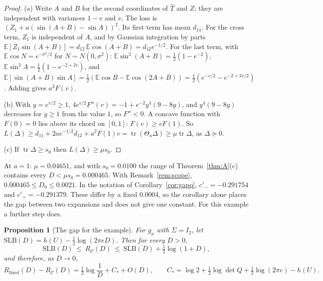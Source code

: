 \documentclass[11pt,onecolumn]{IEEEtran}
\newtheorem{proposition}[theorem]{Proposition}
\newcommand{\E}{\mathbb{E}}
\newcommand{\tr}{\operatorname{tr}}
\newcommand{\Rfix}{R_{\mathrm{fixed}}}
\newcommand{\RC}{R_{\mathcal C}}
\begin{document}
\begin{proof}
(a) Write $A$ and $B$ for the second coordinates of $\hat T$ and $Z$; they are independent
with variances $1-v$ and $v$. The loss is $(Z_1+a(\sin(A+B)-\sin A))^2$. Its first term
has mean $d_{11}$. For the cross term, $Z_1$ is independent of $A$, and by Gaussian
integration by parts $\E[Z_1\sin(A+B)]=d_{12}\,\E\cos(A+B)=d_{12}e^{-1/2}$. For the last
term, with $\E\cos N=e^{-\sigma^2/2}$ for $N\sim N(0,\sigma^2)$:
$\E\sin^2(A+B)=\tfrac12(1-e^{-2})$, $\E\sin^2A=\tfrac12(1-e^{-2+2v})$, and
$\E[\sin(A+B)\sin A]=\tfrac12(\E\cos B-\E\cos(2A+B))=\tfrac12(e^{-v/2}-e^{-2+3v/2})$.
Adding gives $a^2F(v)$.

(b) With $y=e^{v/2}\ge1$, $4e^{v/2}F''(v)=-1+e^{-2}y^4(9-8y)$, and $y^4(9-8y)$ decreases
for $y\ge1$ from the value $1$, so $F''<0$. A concave function with $F(0)=0$ lies above its
chord on $[0,1]$: $F(v)\ge vF(1)$. So $L(\Delta)\ge d_{11}+2ae^{-1/2}d_{12}+a^2F(1)v
=\tr(\Theta_a\Delta)\ge\mu\tr\Delta$, as $\Delta\succeq0$.

(c) If $\tr\Delta\ge s_0$ then $L(\Delta)\ge\mu s_0$.
\end{proof}

At $a=1$: $\mu=0.04651$, and with $s_0=0.0100$ the range of Theorem~\ref{thm:A}(c)
contains every $D<\mu s_0=0.000465$. With Remark~\ref{rem:scope},
$0.000465\le D_0\le0.0021$. In the notation of Corollary~\ref{cor:gapq},
$c'_-=-0.291754$ and $c'_+=-0.291379$. These differ by a fixed $0.0004$, so the corollary
alone places the gap between two expansions and does not give one constant. For this
example a further step does.

\begin{proposition}[The gap for the example]\label{prop:gapex}
For $g_a$ with $\Sigma=I_2$, let
$\mathrm{SLB}(D)=h(U)-\tfrac12\log(2\pi eD)$. Then for every $D>0$,
\[
\mathrm{SLB}(D)\ \le\ \RC(D)\ \le\ \mathrm{SLB}(D)+\tfrac12\log(1+D),
\]
and therefore, as $D\to0$,
\[
\Rfix(D)-\RC(D)=\tfrac12\log\frac1D+C_*+O(D),\qquad
C_*=\log2+\tfrac12\log\det Q+\tfrac12\log(2\pi e)-h(U).
\]
\end{proposition}
\end{document}
